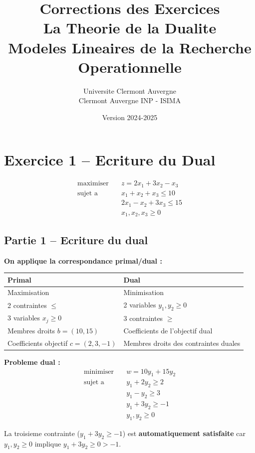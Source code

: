 \documentclass[12pt,a4paper]{article}
\title{\textbf{\Huge\color{titrebleu}Corrections des Exercices}\\[0.5em]
\large\color{defvert}La Theorie de la Dualite\\
\small Modeles Lineaires de la Recherche Operationnelle}
\author{\large Universite Clermont Auvergne\\
\small Clermont Auvergne INP - ISIMA}
\date{\large Version 2024-2025}
\begin{document}
\maketitle
\tableofcontents
\newpage

\section{Exercice 1 -- Ecriture du Dual}

\begin{enonce}
\begin{align*}
\text{maximiser} \quad & z = 2x_1 + 3x_2 - x_3\\
\text{sujet a} \quad & x_1 + x_2 + x_3 \leq 10\\
& 2x_1 - x_2 + 3x_3 \leq 15\\
& x_1, x_2, x_3 \geq 0
\end{align*}
\end{enonce}

\subsection{Partie 1 -- Ecriture du dual}

\begin{correction}
\textbf{On applique la correspondance primal/dual :}

\begin{center}
\begin{tabular}{l|l}
\toprule
\textbf{Primal} & \textbf{Dual} \\
\midrule
Maximisation & Minimisation \\
2 contraintes $\leq$ & 2 variables $y_1, y_2 \geq 0$ \\
3 variables $x_j \geq 0$ & 3 contraintes $\geq$ \\
Membres droits $b = (10, 15)$ & Coefficients de l'objectif dual \\
Coefficients objectif $c = (2, 3, -1)$ & Membres droits des contraintes duales \\
\bottomrule
\end{tabular}
\end{center}

\textbf{Probleme dual :}
\begin{align*}
\text{minimiser} \quad & w = 10y_1 + 15y_2\\
\text{sujet a} \quad & y_1 + 2y_2 \geq 2\\
& y_1 - y_2 \geq 3\\
& y_1 + 3y_2 \geq -1\\
& y_1, y_2 \geq 0
\end{align*}

La troisieme contrainte ($y_1 + 3y_2 \geq -1$) est \textcolor{defvert}{\textbf{automatiquement satisfaite}} car $y_1, y_2 \geq 0$ implique $y_1 + 3y_2 \geq 0 > -1$.
\end{correction}
\end{document}
